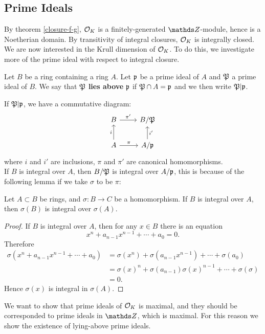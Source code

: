 		\subsection{Prime Ideals}
			By theorem \ref{closure-f-g}, $\mathcal{O}_K$ is a finitely-generated $\Z$-module, hence is a Noetherian domain. By transitivity of integral closures, $\mathcal{O}_K$ is integrally closed. We are now interested in the Krull dimension of $\mathcal{O}_K$. To do this, we investigate more of the prime ideal with respect to integral closure. 
			\begin{definition}
				Let $B$ be a ring containing a ring $A$. Let $\mathfrak{p}$ be a prime ideal of $A$ and $\mathfrak{P}$ a prime ideal of $B$. We say that $\mathfrak{P}$ \textbf{lies above} $\mathfrak{p}$ if $\mathfrak{P} \cap A = \mathfrak{p}$ and we then write $\mathfrak{P}|\mathfrak{p}$.
			\end{definition}
			
			If $\mathfrak{P}|\mathfrak{p}$, we have a commutative diagram:
			\[
			\begin{tikzcd}
				B \arrow[r, "\pi'"]               & B/\mathfrak{P}                  \\
				A \arrow[r, "\pi"] \arrow[u, "i"] & A/\mathfrak{p} \arrow[u, "i'"']
			\end{tikzcd}
			\]
			where $i$ and $i'$ are inclusions, $\pi$ and $\pi'$ are canonical homomorphisms. \\
			If $B$ is integral over $A$, then $B/\mathfrak{P}$ is integral over $A/\mathfrak{p}$, this is because of the following lemma if we take $\sigma$ to be $\pi$:
			\begin{lemma}
				Let $A \subset B$ be rings, and $\sigma:B \to C$ be a homomorphism. If $B$ is integral over $A$, then $\sigma(B)$ is integral over $\sigma(A)$.
			\end{lemma}
			\begin{proof}
				If $B$ is integral over $A$, then for any $x \in B$ there is an equation
				\[
				x^n + a_{n-1}x^{n-1}+\cdots+a_0 = 0.
				\]
				Therefore
				\[
				\begin{aligned}
					\sigma(x^n+a_{n-1}x^{n-1}+\cdots+a_0) &= \sigma(x^n)+\sigma(a_{n-1}x^{n-1})+\cdots+\sigma(a_0) \\
					&= \sigma(x)^n + \sigma(a_{n-1})\sigma(x)^{n-1}+\cdots+\sigma(\sigma) \\
					&= 0.
				\end{aligned}
				\]
				Hence $\sigma(x)$ is integral in $\sigma(A)$.
			\end{proof}
			
			We want to show that prime ideals of $\mathcal{O}_K$ is maximal, and they should be corresponded to prime ideals in $\Z$, which is maximal. For this reason we show the existence of lying-above prime ideals.
			
